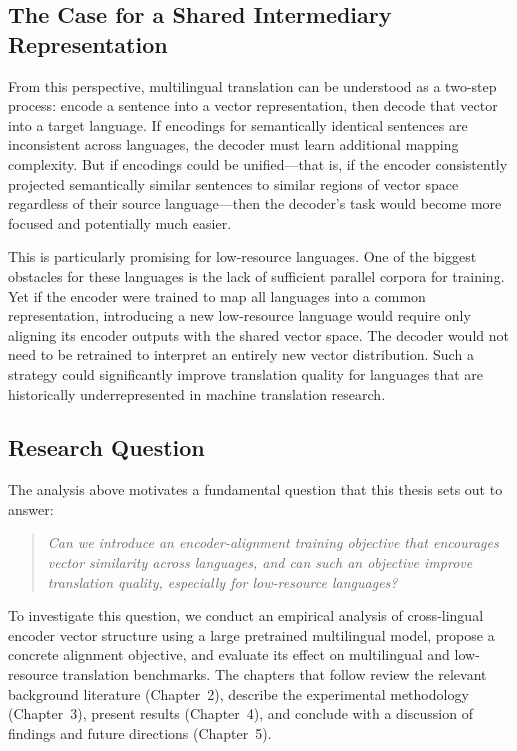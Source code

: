\subsection{The Case for a Shared Intermediary Representation}

From this perspective, multilingual translation can be understood as a two-step process: encode a sentence into a vector representation, then decode that vector into a target language. If encodings for semantically identical sentences are inconsistent across languages, the decoder must learn additional mapping complexity. But if encodings could be unified---that is, if the encoder consistently projected semantically similar sentences to similar regions of vector space regardless of their source language---then the decoder's task would become more focused and potentially much easier.

This is particularly promising for low-resource languages. One of the biggest obstacles for these languages is the lack of sufficient parallel corpora for training. Yet if the encoder were trained to map all languages into a common representation, introducing a new low-resource language would require only aligning its encoder outputs with the shared vector space. The decoder would not need to be retrained to interpret an entirely new vector distribution. Such a strategy could significantly improve translation quality for languages that are historically underrepresented in machine translation research.

\subsection{Research Question}

The analysis above motivates a fundamental question that this thesis sets out to answer:

\begin{quote}
\textit{Can we introduce an encoder-alignment training objective that encourages vector similarity across languages, and can such an objective improve translation quality, especially for low-resource languages?}
\end{quote}

To investigate this question, we conduct an empirical analysis of cross-lingual encoder vector structure using a large pretrained multilingual model, propose a concrete alignment objective, and evaluate its effect on multilingual and low-resource translation benchmarks. The chapters that follow review the relevant background literature (Chapter~2), describe the experimental methodology (Chapter~3), present results (Chapter~4), and conclude with a discussion of findings and future directions (Chapter~5).
